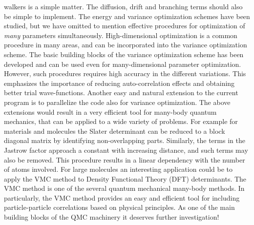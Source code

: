 walkers is a simple matter. The diffusion, drift and branching terms
should also be simple to implement.
\newline
%
\newline
The energy and variance optimization schemes have been
studied, but we have omitted to mention effective procedures for
optimization of \emph{many} parameters simultaneously. High-dimensional
optimization is a common procedure in many areas, and can be
incorporated into the variance optimization scheme. The basic building
blocks of the variance optimization scheme has been developed and can
be used even for many-dimensional parameter optimization. However,
such procedures requires high accuracy in the different variations.
This emphasizes the importance of reducing auto-correlation effects
and obtaining better trial wave-functions.  Another easy and natural
extension to the current program is to parallelize the code also for
variance optimization.
\newline
%
\newline
The above extensions would result in a very efficient tool for
many-body quantum mechanics, that can be applied to a wide variety of
problems. For example for materials and molecules the Slater
determinant can be reduced to a block diagonal matrix by identifying
non-overlapping parts. Similarly, the terms in the Jastrow
factor approach a constant with increasing distance, and such terms
may also be removed. This procedure results in a linear dependency
with the number of atoms involved. For large molecules an interesting
application could be to apply the VMC method to Density Functional
Theory (DFT) determinants.
\newline
%
\newline
The VMC method is one of the several quantum mechanical many-body
methods. In particularly, the VMC method provides an easy and
efficient tool for including particle-particle correlations based on
physical principles. As one of the main building blocks of the QMC
machinery it deserves further investigation!

%  

